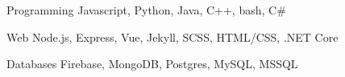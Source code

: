 

\begin{cvskills}

  \cvskill
    {Programming} %
    {Javascript, Python, Java, C++, bash, C\#} %

  \cvskill
    {Web} %
    {Node.js, Express, Vue, Jekyll, SCSS, HTML/CSS, .NET Core} %

  \cvskill
    {Databases} %
    {Firebase, MongoDB, Postgres, MySQL, MSSQL} %

\end{cvskills}
